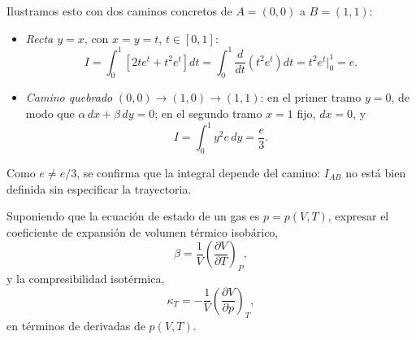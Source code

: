 \documentclass[12pt,a4paper]{article}
\newcommand{\paren}[1]{\left( #1 \right)}
\newcommand{\pd}[3]{\left(\frac{\partial #1}{\partial #2}\right)_{#3}}
\begin{document}
\begin{solucion}
\begin{enumerate}
            Ilustramos esto con dos caminos concretos de $A=(0,0)$ a $B=(1,1)$:
            \begin{itemize}
                \item \emph{Recta $y=x$}, con $x=y=t$, $t\in[0,1]$:
                \begin{equation*}
                    I=\int_{0}^{1}\left[2te^{t}+t^{2}e^{t}\right]dt=\int_{0}^{1}\frac{d}{dt}\paren{t^{2}e^{t}}dt=t^{2}e^{t}\Big|_{0}^{1}=e.
                \end{equation*}
                \item \emph{Camino quebrado} $(0,0)\to(1,0)\to(1,1)$: en el primer tramo $y=0$,
                de modo que $\alpha\,dx+\beta\,dy=0$; en el segundo tramo $x=1$ fijo, $dx=0$, y
                \begin{equation*}
                    I=\int_{0}^{1}y^{2}e\,dy=\frac{e}{3}.
                \end{equation*}
            \end{itemize}
            Como $e\neq e/3$, se confirma que la integral depende del camino: $I_{AB}$ no está
            bien definida sin especificar la trayectoria.
        \end{enumerate}
    \end{solucion}

    \begin{problema}
        Suponiendo que la ecuación de estado de un gas es $p=p(V,T)$, expresar el coeficiente
        de expansión de volumen térmico isobárico,
        \begin{equation*}
            \beta=\frac{1}{V}\pd{V}{T}{P},
        \end{equation*}
        y la compresibilidad isotérmica,
        \begin{equation*}
            \kappa_{T}=-\frac{1}{V}\pd{V}{p}{T},
        \end{equation*}
        en términos de derivadas de $p(V,T)$.
    \end{problema}
\end{document}
